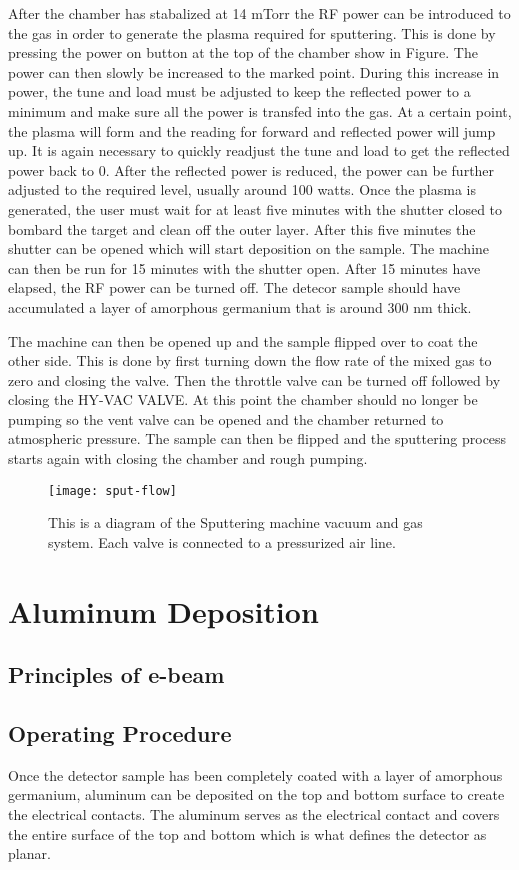 After the chamber has stabalized at 14 mTorr the RF power can be introduced to the gas in order to generate the plasma required for sputtering.
This is done by pressing the power on button at the top of the chamber show in Figure.
The power can then slowly be increased to the marked point.
During this increase in power, the tune and load must be adjusted to keep the reflected power to a minimum and make sure all the power is transfed into the gas.
At a certain point, the plasma will form and the reading for forward and reflected power will jump up.
It is again necessary to quickly readjust the tune and load to get the reflected power back to 0.
After the reflected power is reduced, the power can be further adjusted to the required level, usually around 100 watts.
Once the plasma is generated, the user must wait for at least five minutes with the shutter closed to bombard the target and clean off the outer layer.
After this five minutes the shutter can be opened which will start deposition on the sample.
The machine can then be run for 15 minutes with the shutter open.
After 15 minutes have elapsed, the RF power can be turned off.
The detecor sample should have accumulated a layer of amorphous germanium that is around 300 nm thick.

The machine can then be opened up and the sample flipped over to coat the other side.
This is done by first turning down the flow rate of the mixed gas to zero and closing the valve.
Then the throttle valve can be turned off followed by closing the HY-VAC VALVE.
At this point the chamber should no longer be pumping so the vent valve can be opened and the chamber returned to atmospheric pressure.
The sample can then be flipped and the sputtering process starts again with closing the chamber and rough pumping.
\begin{sidewaysfigure}
\texttt{[image: sput-flow]}
\caption{This is a diagram of the Sputtering machine vacuum and gas system. Each valve is connected to a pressurized air line.}
\label{fig:sput-flow}
\end{sidewaysfigure}%

\section{Aluminum Deposition}
\subsection{Principles of e-beam}
\subsection{Operating Procedure}
Once the detector sample has been completely coated with a layer of amorphous germanium, aluminum can be deposited on the top and bottom surface to create the electrical contacts.
The aluminum serves as the electrical contact and covers the entire surface of the top and bottom which is what defines the detector as planar.

